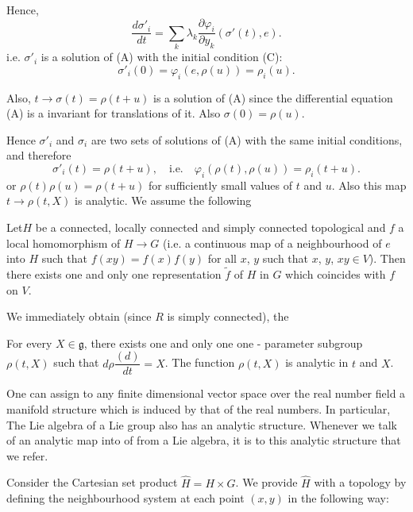 Hence,
$$
\frac{d \sigma'_i}{dt} = \sum_{k} \lambda_k \frac{\partial
  \varphi_i}{\partial y_k}(\sigma'(t), e). 
$$
i.e. $\sigma'_i$ is a solution of (A) with the initial condition
(C): 
$$
\sigma'_i (0) = \varphi_i(e,\rho (u))= \rho_i(u).
$$

Also, $t \rightarrow \sigma(t)= \rho(t+u)$ is a solution of (A)
since the differential equation (A) is a invariant for translations
of it. Also $\sigma(0) = \rho(u)$. 

Hence $\sigma'_i$ and $\sigma_i$ are two sets of solutions of (A)
with the same initial conditions, and therefore 
$$
\sigma'_i(t)= \rho(t + u),\quad\text{i.e.}\quad \varphi_i(\rho (t),\rho (u))=
\rho_i(t + u). 
$$
or $\rho(t) \rho (u)= \rho (t+u)$ for sufficiently small values of $t$
and $u$. Also this map $t \rightarrow \rho (t,X)$ is analytic. We
assume the following 

\begin{lem}\label{chap3-lem1}%
 Let\pageoriginale $H$ be a connected, locally connected and simply
 connected  topological and $f$ a local homomorphism of $H \rightarrow
 G$ (i.e. a 
 continuous map of a neighbourhood of $e$ into $H$ such that
 $f(xy)=f(x) f(y)$ for all $x$, $y$ such  that $x$, $y$, $xy \in V$). Then
 there exists one and only one representation $\tilde{f}$ of $H$ in
 $G$ which coincides with $f$ on $V$. 
\end{lem} 

We immediately obtain (since $R$ is simply connected), the

\setcounter{thm}{0}
\begin{thm}\label{chap3-thm1}%
 For every $X \in \mathfrak{g}$, there exists one and only one
   one - parameter subgroup $\rho (t,X)$ {such that} $d \rho
 \dfrac{(d)}{dt}=X$. {The function} $\rho(t, X)$ {is analytic
   in} $t$ {and} $X$. 
\end{thm}

One can assign to any finite dimensional vector space over the real
number field a manifold structure which is induced by that of the
real numbers. In particular, The Lie algebra of a Lie group also has
an analytic structure. Whenever we talk of an analytic map into of
from a Lie algebra, it is to this analytic structure that we refer. 

\medskip
{}
Consider the Cartesian set product $\hat{H}=H \times G$. We provide
$\hat{H}$ with a topology by defining the neighbourhood system at each
point $(x,y)$ in the following way: 


